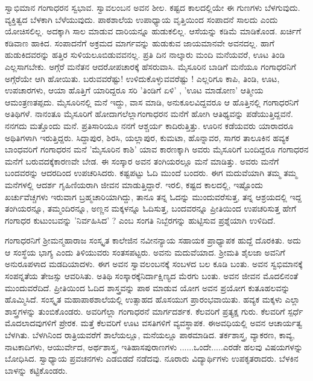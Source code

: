 {ಸ್ವಾಭಿಮಾನ ಗಂಗಾಧರನ ಸ್ವಭಾವ. ಸ್ವಾವಲಂಬನ ಅವನ ಶೀಲ. ಕಷ್ಟದ ಕಾಲ\-ದಲ್ಲಿಯೇ ಈ ಗುಣಗಳು ಬೆಳಗುವುದು. ವ್ಯಕ್ತಿತ್ವದ ಬೆಳಕಾಗಿ ಬೆಳೆಯುವುದು. ಪಾಠಶಾಲೆಯ    ಉಪಾಧ್ಯಾಯ ವೃತ್ತಿಯಿಂದ ಸಂಪಾದನೆ ಸಾಲದು ಎಂದು ಯೋಚಿಸಲಿಲ್ಲ. ಅದಕ್ಕಾಗಿ ಸಾಲ ಮಾಡುವ ದಾರಿಯನ್ನೂ ಹುಡುಕಲಿಲ್ಲ. ಆಸೆಯನ್ನು ಕಡಿಮೆ ಮಾಡಿಕೊಂಡ. ಖರ್ಚಿಗೆ ಕಡಿವಾಣ ಹಾಕಿದ. ಸಂಪಾದನೆಗೆ ಅಕ್ರಮದ ಮಾರ್ಗವನ್ನು ಹುಡುಕುವ ಜಾಯಮಾನವೇ ಅವನದಲ್ಲ. ಹಾಗೆ ಹುಡುಕಿದವರನ್ನು ಹತ್ತಿರ ಸುಳಿಯಲೂ\break ಬಿಡುವವನಲ್ಲ. ಪ್ರತಿ ದಿನ ನಾಲ್ಕಾರು ಮಂದಿ ಮನೆಯವರೆ, ಊಟ ತಿಂಡಿ ಎಲ್ಲ\break ಸಾಗಬೇಕು. ಅಗ್ಗೆರೆ ಮನೆತನ ಆದರೋಪಚಾರಕ್ಕೆ ಹೆಸರುವಾಸಿ. ಮೈಸೂರಿನ ಬಾಡಿಗೆ ಮನೆಯೂ ಗಂಗಾಧರನಿಗೆ ಅಗ್ಗೆರೆಯೇ ಆಗಿ ಹೋಯಿತು. ಬರುವವರೆಷ್ಟು! ಉಳಿದುಕೊಳ್ಳುವವರೆಷ್ಟು ! ಎಲ್ಲರಿಗೂ ಕಾಪಿ, ತಿಂಡಿ, ಊಟ, ಉಪಚಾರಗಳು, ಆಯಾ ಹೊತ್ತಿಗೆ ಯಾರಿದ್ದರೂ ಸರಿ 'ತಿಂಡಿಗೆ ಏಳಿ' , 'ಊಟ ಮಾಡೋಣ' ಆತ್ಮೀಯ ಆಮಂತ್ರಣ\break ತಪ್ಪದು.  ಮೈಸೂರಿನಲ್ಲಿ ಮನೆ ಇದ್ದು, ವಾಸ ಮಾಡಿ, ಅನುಕೂಲವಿದ್ದವರೂ ಆ ಹೊತ್ತಿ\-ನಲ್ಲಿ ಗಂಗಾಧರನಿಗೆ ಅತಿಥಿಗಳೆ. ನಾನಂತೂ ಮೈಸೂರಿಗೆ ಹೋದಾಗಲೆಲ್ಲಾ\break ಗಂಗಾಧರನ ಮನೆಗೆ ಹೋಗಿ ಆತಿಥ್ಯವನ್ನು ಪಡೆಯುತ್ತಿದ್ದವನೆ. ನನಗದು ಮತ್ತೊಂದು ಮನೆ. ಪ್ರತಿಸಾರಿಯೂ ನನಗೆ ಆಶ್ಚರ್ಯ ಕಾದಿರುತ್ತಿತ್ತು. ಊರಿನ ಕಡೆಯವರು ಯಾರಾದರೂ ಅಥಿತಿಗಳಾಗಿ ಇರುತ್ತಿದ್ದರು. ಸಿದ್ದಾಪುರ, ಶಿರಸಿ, ಯಲ್ಲಾಪುರ, ಕುಮಟಾ, ಹೊನ್ನಾವರ, ಸಾಗರ ತಾಲೂಕಿನ ಹವ್ಯಕ ಬಾಂಧವರಿಗೆ ಗಂಗಾಧರನ ಮನೆ 'ಮೈಸೂರಿನ ಕಾಶಿ' ಯಾವ ಕಾರಣಕ್ಕಾಗಿ  ಅವರು ಮೈಸೂರಿಗೆ ಬಂದಿದ್ದರೂ ಗಂಗಾಧರನ ಮನೆಗೆ ಬರುವದಕ್ಕೆ\break ಕಾರಣವೇ ಬೇಡ. ಈ ಸಂಸ್ಕಾರ ಅವನ ತಂಗಿಯರಲ್ಲೂ  ಮನೆ ಮಾಡಿತ್ತು. ಅವರು ಮನೆಗೆ ಬಂದವರನ್ನು ಆದರದಿಂದ ಉಪಚರಿಸಿದರು. ಕಷ್ಟಪಟ್ಟು ಓದಿ ಮುಂದೆ ಬಂದರು. ಈಗ ಮದುವೆಯಾಗಿ ತಮ್ಮ ತಮ್ಮ ಮನೆಗಳಲ್ಲಿ ಆದರ್ಶ ಗೃಹಿಣಿಯರಾಗಿ ಜೀವನ ಮಾಡುತ್ತಿದ್ದಾರೆ. ಇರಲಿ, ಕಷ್ಟದ ಕಾಲದಲ್ಲಿ, ಇಷ್ಟೊಂದು ಖರ್ಚುವೆಚ್ಚಗಳು ಇರುವಾಗ ಬ್ರಹ್ಮಚಾರಿಯಾಗಿದ್ದು, ತಾನೂ ತನ್ನ ಓದನ್ನು ಮುಂದುವರೆಸುತ್ತ,  ತನ್ನ ಆಶ್ರಯದಲ್ಲಿ  ಇದ್ದ ತಂಗಿಯರನ್ನೂ, ತಮ್ಮಂದಿರನ್ನೂ, ಅಣ್ಣನ ಮಕ್ಕಳನ್ನೂ ಓದಿಸುತ್ತ, ಬಂದವರನ್ನೂ ಪ್ರೀತಿಯಿಂದ ಉಪಚರಿಸುತ್ತ  ಹೇಗೆ ಗಂಗಾಧರ ಕುಟುಂಬವನ್ನು 'ನಿರ್ವಹಿಸಿದ' ? ಎಂಬ ಸಂಗತಿ ನಿಬ್ಬೆರ\-ಗನ್ನು ಹುಟ್ಟಿಸುವ ಪ್ರಶ್ನೆಯಾಗಿ ಉಳಿದಿದೆ. 

ಗಂಗಾಧರನಿಗೆ ಶ್ರೀಮನ್ಮಹಾರಾಜ ಸಂಸ್ಕೃತ  ಕಾಲೇಜಿನ ನವೀನನ್ಯಾಯ  ಸಹಾಯಕ ಪ್ರಾಧ್ಯಾಪಕ ಹುದ್ದೆ ದೊರಕಿತು. ಅದು ಆ ಸಂಸ್ಥೆಯ ಭಾಗ್ಯ ಎಂದು ತಿಳಿಯು\-ವರು ಸಂತಸಪಟ್ಟರು. ಅವನು ಮದುವೆಯಾದ. ಶ್ರೀಮತಿ ಶೈಲಜಾ ಅವನಿಗೆ ಅನುರೂಪಳಾದ ಮಡದಿಯಾದಳು. ಈಗ ಅವನ ಸ್ವಾವಲಂಬನಕ್ಕೆ ಸಂಬಳದ ಬಲ ಕೂಡಿ ಬಂತು. ಅವನ ಸ್ವಭಿಮಾನಕ್ಕೆ ಸಂಪನ್ನತೆಯ ತೇಜಸ್ಸು ಆವರಿಸಿತು. ಅತಿಥಿ ಸಂಸ್ಕಾರಕ್ಕೆ\break ನಿರ್ದಾಕ್ಷಿಣ್ಯದ ಮೆರಗು ಬಂತು. ಅವನ ಜೀವನ ಮೊದಲಿನಂತೆ ಮುಂದುವರೆದಿದೆ. ಪ್ರೀತಿಯಿಂದ ಓದಿದ   ಶಾಸ್ತ್ರವನ್ನು ಪಾಠ ಮಾಡುವ ಯೋಗ ಅವನ ಪ್ರಯೋಗ ಕುತೂಹಲ\-ವನ್ನು ಹೊಮ್ಮಿಸಿದೆ. ಸಂಸ್ಕೃತ ಮಹಾಪಾಠಶಾಲೆಯಲ್ಲಿ  ಉತ್ಸಾಹದ ಹೊಸಯುಗ ಪ್ರಾರಂಭವಾಯಿತು. ಹವ್ಯಕ ಮಕ್ಕಳು ಎಲ್ಲಾ ಶಾಸ್ತ್ರಗಳನ್ನು ತುಂಬಿಕೊಂಡರು. ಅವರಿಗೆಲ್ಲಾ ಗಂಗಾಧರನೆ ಮಾರ್ಗದರ್ಶಕ. ಕೆಲವರಿಗೆ ಪ್ರತ್ಯಕ್ಷ ಗುರು. ಕೆಲವರಿಗೆ ಸ್ಪರ್ಧೆ ಮೊದಲಾದವುಗಳಿಗೆ ಪ್ರೇರಕ. ಮತ್ತೆ ಕೆಲವರಿಗೆ ಊಟ ವಸತಿಗಳಿಗೆ ವ್ಯವಸ್ಥಾಪಕ. ಈ\break ಅವಧಿಯಲ್ಲಿ ಅವನ ಆಚಾರ್ಯತ್ವ ಬೆಳಗಿತು.  ಬೆಳಗಿನಿಂದ ರಾತ್ರಿಯವರೆಗೆ ಶಾಲೆಯಲ್ಲೂ, ಮನೆಯಲ್ಲೂ ಪಾಠಮಾಡಿದ. ತರ್ಕಶಾಸ್ತ್ರ, ವ್ಯಾಕರಣ, ಕಾವ್ಯ, ನಾಟಕಾದಿಗಳು, ಆಯುರ್ವೇದ, ಅರ್ಥಶಾಸ್ತ್ರ, ಇತಿಹಾಸಪುರಾಣಗಳು ......ಒಂದೇ.....ಎರಡೇ ಹಲವು ವಿಷಯಗಳನ್ನು ಬೋಧಿಸಿದ. ಸ್ವಾಧ್ಯಾಯ ಪ್ರವಚನಗಳು ಎಡಬಿಡದೆ ನಡೆದವು. ನೂರಾರು ವಿದ್ಯಾರ್ಥಿಗಳು ಉಪಕೃತರಾದರು. ಬೆಳಕಿನ ಬಾಳನ್ನು ಕಟ್ಟಿಕೊಂಡರು. 

}
